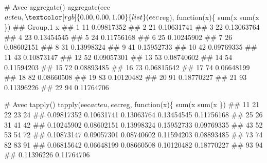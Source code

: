 \documentclass[12pt,twosided, notitlepage]{book}
\newenvironment{Shaded}{}{}
\newcommand{\CommentTok}[1]{\textcolor[rgb]{0.00,0.50,0.00}{#1}}
\newcommand{\ControlFlowTok}[1]{\textcolor[rgb]{0.00,0.00,1.00}{#1}}
\newcommand{\DataTypeTok}[1]{#1}
\newcommand{\KeywordTok}[1]{\textcolor[rgb]{0.00,0.00,1.00}{#1}}
\newcommand{\NormalTok}[1]{#1}
\newcommand{\OperatorTok}[1]{#1}
\newcommand{\OtherTok}[1]{\textcolor[rgb]{1.00,0.25,0.00}{#1}}
\newcommand{\StringTok}[1]{\textcolor[rgb]{0.00,0.50,0.50}{#1}}
\renewenvironment{Shaded}{\begin{snugshade}}{\end{snugshade}}
\begin{document}
\begin{enumerate}
\begin{enumerate}
\begin{Shaded}
\begin{Highlighting}[]
\CommentTok{# Avec aggregate()}
\KeywordTok{aggregate}\NormalTok{(eec}\OperatorTok{$}\NormalTok{acteu, }\KeywordTok{list}\NormalTok{(eec}\OperatorTok{$}\NormalTok{reg), }\ControlFlowTok{function}\NormalTok{(x)\{}
  \KeywordTok{sum}\NormalTok{(x }\OperatorTok{%
\StringTok{    }\KeywordTok{sum}\NormalTok{(x }\OperatorTok{%
\NormalTok{\})}
\NormalTok{  ##    Group.1          x}
\NormalTok{  ## 1       11 0.09817352}
\NormalTok{  ## 2       21 0.10631741}
\NormalTok{  ## 3       22 0.13063764}
\NormalTok{  ## 4       23 0.13454545}
\NormalTok{  ## 5       24 0.11756168}
\NormalTok{  ## 6       25 0.10245902}
\NormalTok{  ## 7       26 0.08602151}
\NormalTok{  ## 8       31 0.13998324}
\NormalTok{  ## 9       41 0.15952733}
\NormalTok{  ## 10      42 0.09769335}
\NormalTok{  ## 11      43 0.10873147}
\NormalTok{  ## 12      52 0.09057301}
\NormalTok{  ## 13      53 0.08740602}
\NormalTok{  ## 14      54 0.11594203}
\NormalTok{  ## 15      72 0.08893485}
\NormalTok{  ## 16      73 0.06815642}
\NormalTok{  ## 17      74 0.06648199}
\NormalTok{  ## 18      82 0.08660508}
\NormalTok{  ## 19      83 0.10120482}
\NormalTok{  ## 20      91 0.18770227}
\NormalTok{  ## 21      93 0.11396226}
\NormalTok{  ## 22      94 0.11764706}

\CommentTok{# Avec tapply()}
\KeywordTok{tapply}\NormalTok{(eec}\OperatorTok{$}\NormalTok{acteu, eec}\OperatorTok{$}\NormalTok{reg, }\ControlFlowTok{function}\NormalTok{(x)\{}
  \KeywordTok{sum}\NormalTok{(x }\OperatorTok{%
\StringTok{    }\KeywordTok{sum}\NormalTok{(x }\OperatorTok{%
\NormalTok{\})}
\NormalTok{  ##         11         21         22         23         24 }
\NormalTok{  ## 0.09817352 0.10631741 0.13063764 0.13454545 0.11756168 }
\NormalTok{  ##         25         26         31         41         42 }
\NormalTok{  ## 0.10245902 0.08602151 0.13998324 0.15952733 0.09769335 }
\NormalTok{  ##         43         52         53         54         72 }
\NormalTok{  ## 0.10873147 0.09057301 0.08740602 0.11594203 0.08893485 }
\NormalTok{  ##         73         74         82         83         91 }
\NormalTok{  ## 0.06815642 0.06648199 0.08660508 0.10120482 0.18770227 }
\NormalTok{  ##         93         94 }
\NormalTok{  ## 0.11396226 0.11764706}

}}}}
\end{Highlighting}
\end{Shaded}
\end{enumerate}
\end{enumerate}
\end{document}
